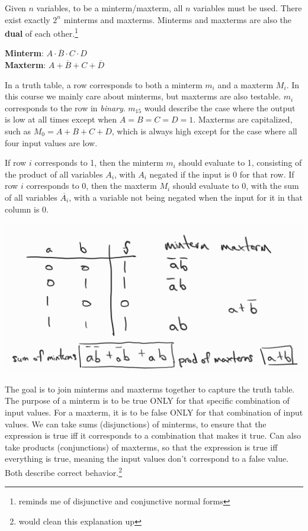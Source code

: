 Given $n$ variables, to be a minterm/maxterm, all $n$ variables must be used. There exist exactly $2^n$ minterms and maxterms. Minterms and maxterms are also the \textbf{dual} of each other.\footnote{reminds me of disjunctive and conjunctive normal forms}

\begin{example}
    \textbf{Minterm}: $A \cdot \overline{B} \cdot C \cdot D$ \\ 
    \textbf{Maxterm}: $A + \overline{B} + C + \overline{D}$
\end{example}

In a truth table, a row corresponds to both a minterm $m_i$ and a maxterm $M_i$. In this course we mainly care about minterms, but maxterms are also testable. $m_i$ corresponds to the row in \textit{binary}. $m_{15}$ would describe the case where the output is low at all times except when $A = B = C = D = 1$. Maxterms are capitalized, such as $M_0 = A+B+C+D$, which is always high except for the case where all four input values are low.

If row $i$ corresponds to 1, then the minterm $m_i$ should evaluate to 1, consisting of the product of all variables $A_i$, with $A_i$ negated if the input is 0 for that row. If row $i$ corresponds to 0, then the maxterm $M_i$ should evaluate to 0, with the sum of all variables $\overline{A_i}$, with a variable not being negated when the input for it in that column is 0. 

\includegraphics{csc258/figures/mintermmaxterm.jpg}

The goal is to join minterms and maxterms together to capture the truth table. The purpose of a minterm is to be true ONLY for that specific combination of input values. For a maxterm, it is to be false ONLY for that combination of input values. We can take sums (disjunctions) of minterms, to ensure that the expression is true iff it corresponds to a combination that makes it true. Can also take products (conjunctions) of maxterms, so that the expression is true iff everything is true, meaning the input values don't correspond to a false value. Both describe correct behavior.\footnote{would clean this explanation up}


